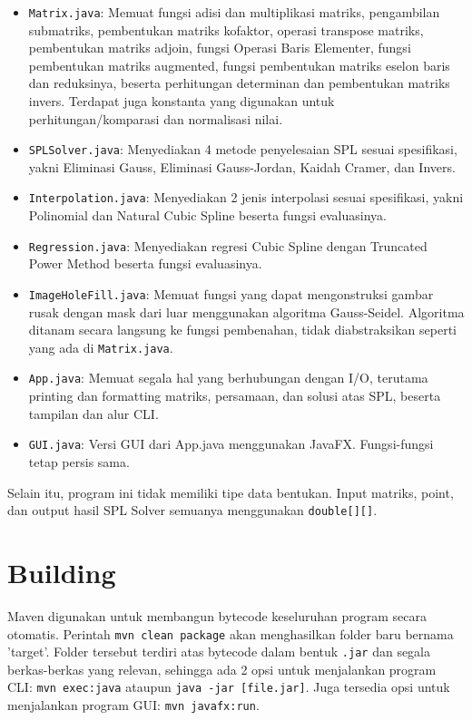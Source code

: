 \documentclass[12pt,a4paper]{report}
\begin{document}
\begin{itemize}
    \item \verb|Matrix.java|: Memuat fungsi adisi dan multiplikasi matriks, 
        pengambilan submatriks, pembentukan matriks kofaktor,
        operasi transpose matriks, pembentukan matriks adjoin, 
        fungsi Operasi Baris Elementer, fungsi pembentukan matriks augmented, 
        fungsi pembentukan matriks eselon baris dan reduksinya, beserta perhitungan 
        determinan dan pembentukan matriks invers. Terdapat juga konstanta yang digunakan
        untuk perhitungan/komparasi dan normalisasi nilai.
    \item \verb|SPLSolver.java|: Menyediakan 4 metode penyelesaian SPL sesuai spesifikasi, 
        yakni Eliminasi Gauss, Eliminasi Gauss-Jordan, Kaidah Cramer, dan Invers.
    \item \verb|Interpolation.java|: Menyediakan 2 jenis interpolasi sesuai spesifikasi, 
        yakni Polinomial dan Natural Cubic Spline beserta fungsi evaluasinya.
    \item \verb|Regression.java|: Menyediakan regresi Cubic Spline dengan Truncated Power 
        Method beserta fungsi evaluasinya.
    \item \verb|ImageHoleFill.java|: Memuat fungsi yang dapat mengonstruksi gambar rusak 
        dengan mask dari luar menggunakan algoritma Gauss-Seidel. Algoritma ditanam secara 
        langsung ke fungsi pembenahan, tidak diabstraksikan seperti yang ada di \verb|Matrix.java|.
    \item \verb|App.java|: Memuat segala hal yang berhubungan dengan I/O, terutama printing
        dan formatting matriks, persamaan, dan solusi atas SPL, beserta tampilan dan alur CLI.
    \item \verb|GUI.java|: Versi GUI dari App.java menggunakan JavaFX. Fungsi-fungsi tetap persis sama.
\end{itemize}

Selain itu, program ini tidak memiliki tipe data bentukan. Input matriks, point, dan output
hasil SPL Solver semuanya menggunakan \verb|double[][]|.

\section{Building}
Maven digunakan untuk membangun bytecode keseluruhan program secara otomatis. Perintah 
\verb|mvn clean package| akan menghasilkan folder baru bernama 'target'. Folder tersebut terdiri atas
bytecode dalam bentuk \verb|.jar| dan segala berkas-berkas yang relevan, sehingga ada 2 opsi untuk menjalankan
program CLI: \verb|mvn exec:java| ataupun \verb|java -jar [file.jar]|. Juga tersedia opsi untuk menjalankan 
program GUI: \verb|mvn javafx:run|.
\end{document}
